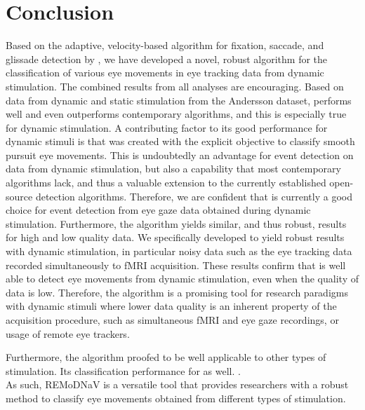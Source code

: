 \section*{Conclusion}\label{con}
Based on the adaptive, velocity-based algorithm for fixation, saccade, and
glissade detection by \cite{Nystrom2010AnData}, we have developed a novel,
robust algorithm for the classification of various eye movements in eye tracking
data from dynamic stimulation.
The combined results from all analyses are encouraging. Based on data from dynamic and static stimulation from the Andersson dataset, \remodnav performs well and even outperforms contemporary algorithms, and this is especially true for dynamic stimulation. A contributing factor to its good performance for dynamic stimuli is that \remodnav was created with the explicit objective to classify smooth pursuit eye movements. This is undoubtedly an advantage for event detection on data from dynamic stimulation, but also a capability that most contemporary algorithms lack, and thus a valuable extension to the currently established open-source detection algorithms. Therefore, we are confident that \remodnav is currently a good choice for event detection from eye gaze data obtained during dynamic stimulation. Furthermore, the algorithm yields similar, and thus robust, results for high and low quality data. We specifically developed \remodnav to yield robust results with dynamic stimulation, in particular noisy data such as the eye tracking data recorded simultaneously to fMRI acquisition. These results confirm that \remodnav is well able to detect eye movements from dynamic stimulation, even when the quality of data is low. Therefore, the algorithm is a promising tool for research paradigms with dynamic stimuli where lower data quality is an inherent property of the acquisition procedure, such as simultaneous fMRI and eye gaze recordings, or usage of remote eye trackers.

Furthermore, the algorithm proofed to be well applicable to other types of stimulation. Its classification performance for
as well. .\\
As such, REMoDNaV is a versatile tool that provides researchers with a robust
method to classify eye movements obtained from different types of stimulation.



